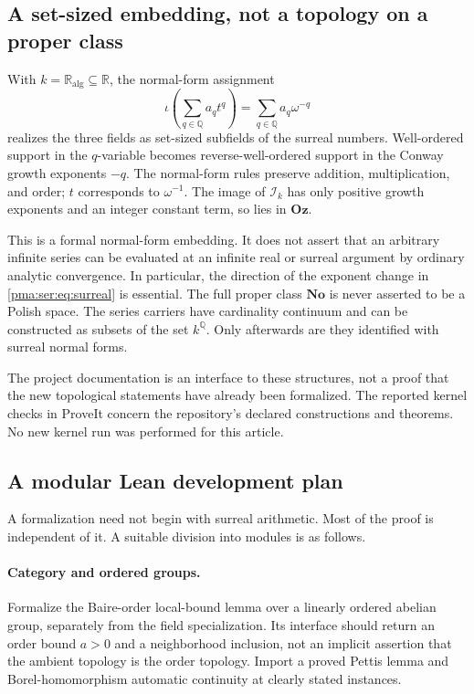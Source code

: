 \documentclass[11pt]{article}
\numberwithin{equation}{section}
\theoremstyle{definition}
\theoremstyle{remark}
\newcommand{\Q}{\mathbb Q}
\newcommand{\R}{\mathbb R}
\newcommand{\No}{\mathbf{No}}
\newcommand{\Oz}{\mathbf{Oz}}
\newcommand{\ka}{\mathbb R_{\mathrm{alg}}}
\newcommand{\Ik}{\mathcal I_k}
\begin{document}
\subsection{A set-sized embedding, not a topology on a proper class}

With $k=\ka\subseteq\R$, the normal-form assignment
\begin{equation}\label{pma:ser:eq:surreal}
 \iota\!\left(\sum_{q\in\Q}a_qt^q\right)
       =\sum_{q\in\Q}a_q\omega^{-q}
\end{equation}
realizes the three fields as set-sized subfields of the surreal numbers.
Well-ordered support in the $q$-variable becomes reverse-well-ordered support
in the Conway growth exponents $-q$. The normal-form rules preserve addition,
multiplication, and order; $t$ corresponds to $\omega^{-1}$.
The image of $\Ik$ has only positive growth exponents and an integer
constant term, so lies in $\Oz$.

This is a formal normal-form embedding. It does not assert that an arbitrary
infinite series can be evaluated at an infinite real or surreal argument by
ordinary analytic convergence. In particular, the direction of the exponent
change in \eqref{pma:ser:eq:surreal} is essential.
The full proper class $\No$ is never asserted to be a Polish space.
The series carriers have cardinality continuum and can be constructed as
subsets of the set $k^\Q$. Only afterwards are they identified with surreal
normal forms.

The project documentation is an interface to these structures, not a proof
that the new topological statements have already been formalized. The
reported kernel checks in ProveIt concern the repository's declared
constructions and theorems. No new kernel run was performed for this article.

\subsection{A modular Lean development plan}

A formalization need not begin with surreal arithmetic. Most of the proof is
independent of it. A suitable division into modules is as follows.

\paragraph{Category and ordered groups.}
Formalize the Baire-order local-bound lemma over a linearly ordered abelian
group, separately from the field specialization. Its interface should return
an order bound $a>0$ and a neighborhood inclusion, not an implicit assertion
that the ambient topology is the order topology. Import a proved Pettis
lemma and Borel-homomorphism automatic continuity at clearly stated instances.
\end{document}
